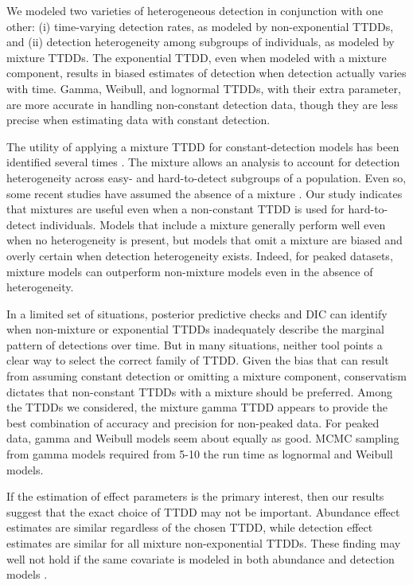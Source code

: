 \documentclass[useAMS,usenatbib,referee,12pt]{article}
\begin{document}
We modeled two varieties of heterogeneous detection in conjunction with one other: (i) time-varying detection rates, as modeled by non-exponential TTDDs, and (ii) detection heterogeneity among subgroups of individuals, as modeled by mixture TTDDs.  The exponential TTDD, even when modeled with a mixture component, results in biased estimates of detection when detection actually varies with time.  Gamma, Weibull, and lognormal TTDDs, with their extra parameter, are more accurate in handling non-constant detection data, though they are less precise when estimating data with constant detection.

The utility of applying a mixture TTDD for constant-detection models has been identified several times \citep{Pledger2000, Farnsworth2002, Alldredge2007, Reidy2011}.  The mixture allows an analysis to account for detection heterogeneity across easy- and hard-to-detect subgroups of a population.  Even so, some recent studies have assumed the absence of a mixture \citep{Solymos2013, Amundson2014}.  Our study indicates that mixtures are useful even when a non-constant TTDD is used for hard-to-detect individuals.  Models that include a mixture generally perform well even when no heterogeneity is present, but models that omit a mixture are biased and overly certain when detection heterogeneity exists.  Indeed, for peaked datasets, mixture models can outperform non-mixture models even in the absence of heterogeneity.

In a limited set of situations, posterior predictive checks and DIC can identify when non-mixture or exponential TTDDs inadequately describe the marginal pattern of detections over time.  But in many situations, neither tool points a clear way to select the correct family of TTDD.  Given the bias that can result from assuming constant detection or omitting a mixture component, conservatism dictates that non-constant TTDDs with a mixture should be preferred.  Among the TTDDs we considered, the mixture gamma TTDD appears to provide the best combination of accuracy and precision for non-peaked data.  For peaked data, gamma and Weibull models seem about equally as good.  MCMC sampling from gamma models required from 5-10 the run time as lognormal and Weibull models.

If the estimation of effect parameters is the primary interest, then our results suggest that the exact choice of TTDD may not be important.  Abundance effect estimates are similar regardless of the chosen TTDD, while detection effect estimates are similar for all mixture non-exponential TTDDs.  These finding may well not hold if the same covariate is modeled in both abundance and detection models \citep{Kery2008}.
\end{document}
